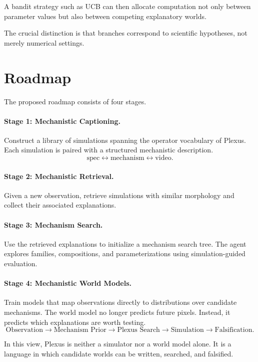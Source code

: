 \documentclass[11pt]{article}
\begin{document}
A bandit strategy such as UCB can then allocate computation not only between
parameter values but also between competing explanatory worlds.

The crucial distinction is that branches correspond to scientific hypotheses,
not merely numerical settings.

\section{Roadmap}
\label{sec:roadmap}

The proposed roadmap consists of four stages.

\paragraph{Stage 1: Mechanistic Captioning.}
Construct a library of simulations spanning the operator vocabulary of Plexus.
Each simulation is paired with a structured mechanistic description.
\[
\text{spec}
\leftrightarrow
\text{mechanism}
\leftrightarrow
\text{video}.
\]

\paragraph{Stage 2: Mechanistic Retrieval.}
Given a new observation, retrieve simulations with similar morphology and
collect their associated explanations.

\paragraph{Stage 3: Mechanism Search.}
Use the retrieved explanations to initialize a mechanism search tree. The agent
explores families, compositions, and parameterizations using simulation-guided
evaluation.

\paragraph{Stage 4: Mechanistic World Models.}
Train models that map observations directly to distributions over candidate
mechanisms. The world model no longer predicts future pixels. Instead, it
predicts which explanations are worth testing.
\[
\text{Observation}
\rightarrow
\text{Mechanism Prior}
\rightarrow
\text{Plexus Search}
\rightarrow
\text{Simulation}
\rightarrow
\text{Falsification}.
\]

In this view, Plexus is neither a simulator nor a world model alone. It is a
language in which candidate worlds can be written, searched, and falsified.
\end{document}
